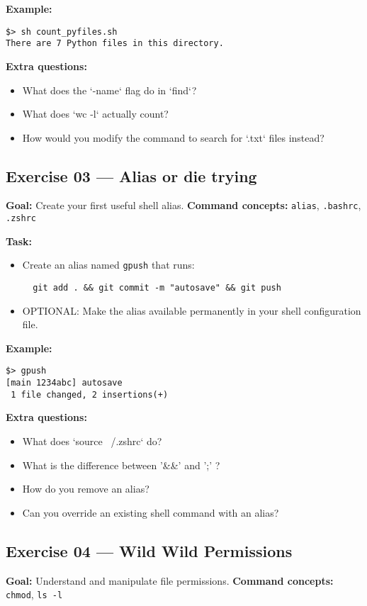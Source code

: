 \documentclass[12pt,a4paper]{article}
\begin{document}
\textbf{Example:}
\begin{lstlisting}
$> sh count_pyfiles.sh
There are 7 Python files in this directory.
\end{lstlisting}

\textbf{Extra questions:}
\begin{itemize}
  \item What does the `-name` flag do in `find`?
  \item What does `wc -l` actually count?
  \item How would you modify the command to search for `.txt` files instead?
\end{itemize}

\newpage
\subsection*{Exercise 03 — Alias or die trying}
\textbf{Goal:} Create your first useful shell alias.
\textbf{Command concepts:} \texttt{alias}, \texttt{.bashrc}, \texttt{.zshrc}

\textbf{Task:}
\begin{itemize}
  \item Create an alias named \texttt{gpush} that runs:
  \begin{lstlisting}
  git add . && git commit -m "autosave" && git push
  \end{lstlisting}
  \item OPTIONAL: Make the alias available permanently in your shell configuration file.
\end{itemize}

\textbf{Example:}
\begin{lstlisting}
$> gpush
[main 1234abc] autosave
 1 file changed, 2 insertions(+)
\end{lstlisting}

\textbf{Extra questions:}
\begin{itemize}
  \item What does `source ~/.zshrc` do?
  \item What is the difference between '\&\&' and ';' ?
  \item How do you remove an alias?
  \item Can you override an existing shell command with an alias?
\end{itemize}

\newpage
\subsection*{Exercise 04 — Wild Wild Permissions}
\textbf{Goal:} Understand and manipulate file permissions.
\textbf{Command concepts:} \texttt{chmod}, \texttt{ls -l}
\end{document}
